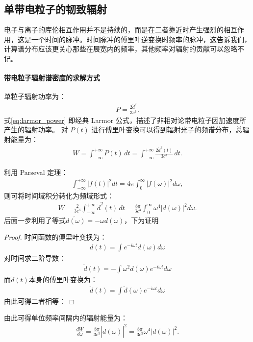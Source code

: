 \subsection{单带电粒子的韧致辐射}
电子与离子的库伦相互作用并不是持续的，而是在二者靠近时产生强烈的相互作用，这是一个时间的脉冲。时间脉冲的傅里叶逆变换时频率的脉冲，这告诉我们，计算谱分布应该更关心那些在展宽内的频率，其他频率对辐射的贡献可以忽略不记。
\paragraph{带电粒子辐射谱密度的求解方式}
单粒子辐射功率为：
\begin{align}
  P = \frac{2\ddot{d}^2}{3c^3}.
  \label{eq:larmor_power}
\end{align}
式\eqref{eq:larmor_power} 即经典 Larmor 公式，描述了非相对论带电粒子因加速度所产生的辐射功率。
对 $P(t)$ 进行傅里叶变换可以得到辐射光子的频谱分布，总辐射能量为：
\begin{align}
  W = \int_{-\infty}^{+\infty} P(t)\,dt
    = \int_{-\infty}^{+\infty} \frac{2\ddot{d}^2(t)}{3c^3}\,dt.
\end{align}

利用 Parseval 定理：
\begin{align}
  \int_{-\infty}^{+\infty} |f(t)|^2 dt
  = 4\pi \int_0^{\infty} |f(\omega)|^2 d\omega,
\end{align}
则可将时间域积分转化为频域形式：
\begin{align}
  W = \frac{2}{3c^3} \int_{-\infty}^{+\infty} \ddot{d}^2(t)\,dt
  = \frac{8\pi}{3c^3} \int_0^{\infty} \omega^4 |d(\omega)|^2 d\omega.
\end{align}
后面一步利用了等式$\ddot{d(\omega)} = -\omega d(\omega)$，下为证明
\begin{proof}
    时间函数的傅里叶变换为：
    \begin{align}
        d(t) = \int e^{-i\omega t}d(\omega)d\omega
    \end{align}
    对时间求二阶导数：
    \begin{align}
        \ddot{d}(t) = - \int \omega^2 d(\omega) e^{-i\omega t}d\omega
    \end{align}
    而$\ddot{d}(t)$本身的傅里叶变换为：
    \begin{align}
        \ddot{d}(t) = \int \ddot{d}(\omega) e^{-i\omega t} d\omega
    \end{align}
由此可得二者相等：
\end{proof}

由此可得单位频率间隔内的辐射能量为：
\begin{align}
  \frac{dW}{d\omega}
  = \frac{8\pi}{3c^3} |\dot{d}(\omega)|^2
  = \frac{8\pi}{3c^3} \omega^4 |d(\omega)|^2.
  \label{eq:spec_energy}
\end{align}

